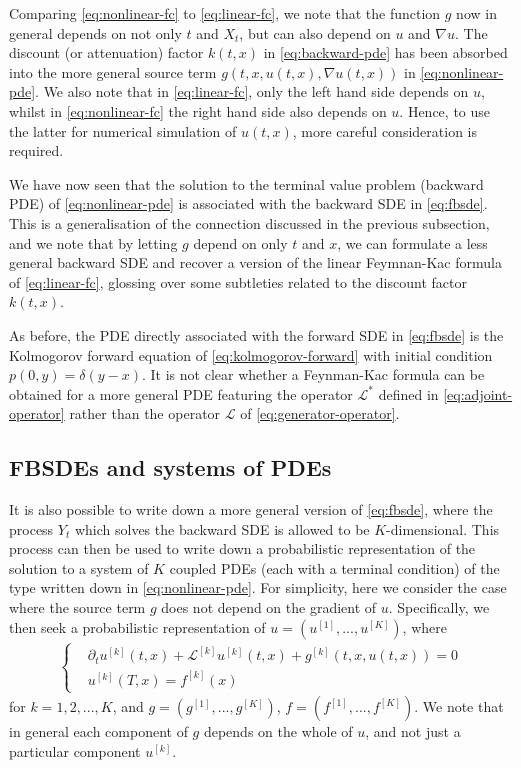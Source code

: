 \documentclass{article}  %
\begin{document}
Comparing \autoref{eq:nonlinear-fc} to \autoref{eq:linear-fc}, we note that the function $g$ now in general depends on not only $t$ and $X_t$, but can also depend on $u$ and $\nabla u$. The discount (or attenuation) factor $k(t,x)$ in \autoref{eq:backward-pde} has been absorbed into the more general source term $g(t,x,u(t,x),\nabla u(t,x))$ in \autoref{eq:nonlinear-pde}. We also note that in \autoref{eq:linear-fc}, only the left hand side depends on $u$, whilst in \autoref{eq:nonlinear-fc} the right hand side also depends on $u$. Hence, to use the latter for numerical simulation of $u(t,x)$, more careful consideration is required.

We have now seen that the solution to the terminal value problem (backward PDE) of \autoref{eq:nonlinear-pde} is associated with the backward SDE in \autoref{eq:fbsde}. This is a generalisation of the connection discussed in the previous subsection, and we note that by letting $g$ depend on only $t$ and $x$, we can formulate a less general backward SDE and recover a version of the linear Feymnan-Kac formula of \autoref{eq:linear-fc}, glossing over some subtleties related to the discount factor $k(t,x)$.

As before, the PDE directly associated with the forward SDE in \autoref{eq:fbsde} is the Kolmogorov forward equation of \autoref{eq:kolmogorov-forward} with initial condition $p(0,y)=\delta(y-x)$. It is not clear whether a Feynman-Kac formula can be obtained for a more general PDE featuring the operator $\mathcal{L}^*$ defined in \autoref{eq:adjoint-operator} rather than the operator $\mathcal{L}$ of \autoref{eq:generator-operator}. 

\subsection{FBSDEs and systems of PDEs}

It is also possible to write down a more general version of \autoref{eq:fbsde}, where the process $Y_t$ which solves the backward SDE is allowed to be $K$-dimensional. This process can then be used to write down a probabilistic representation of the solution to a system of $K$ coupled PDEs (each with a terminal condition) of the type written down in \autoref{eq:nonlinear-pde}. For simplicity, here we consider the case where the source term $g$ does not depend on the gradient of $u$. Specifically, we then seek a probabilistic representation of $u = (u^{[1]},...,u^{[K]})$, where 
%
\begin{align} 
    \label{eq:pde-system}
\begin{cases}
    &\partial_t u^{[k]}(t,x) + \mathcal{L}^{[k]} u^{[k]}(t,x) + g^{[k]}(t,x,u(t,x)) = 0\\
    &u^{[k]}(T,x) = f^{[k]}(x)
\end{cases}
\end{align}
%
for $k=1,2,...,K$, and $g=(g^{[1]},...,g^{[K]})$, $f=(f^{[1]},...,f^{[K]})$. We note that in general each component of $g$ depends on the whole of $u$, and not just a particular component $u^{[k]}$.
\end{document}
